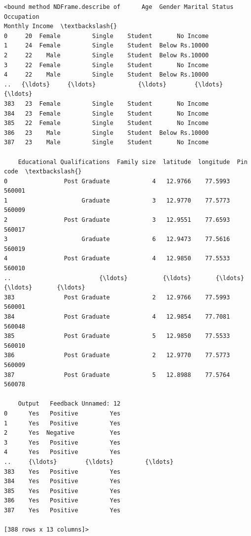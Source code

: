 \documentclass[11pt]{article}
\makeatletter
\newcommand{\boxspacing}{\kern\kvtcb@left@rule\kern\kvtcb@boxsep}
\newcommand{\prompt}[4]{
        {\ttfamily\llap{{\color{#2}[#3]:\hspace{3pt}#4}}\vspace{-\baselineskip}}
    }
\makeatother
\begin{document}
            \begin{tcolorbox}[breakable, size=fbox, boxrule=.5pt, pad at break*=1mm, opacityfill=0]
\prompt{Out}{outcolor}{7}{\boxspacing}
\begin{Verbatim}[commandchars=\\\{\}]
<bound method NDFrame.describe of      Age  Gender Marital Status Occupation
Monthly Income  \textbackslash{}
0     20  Female         Single    Student       No Income
1     24  Female         Single    Student  Below Rs.10000
2     22    Male         Single    Student  Below Rs.10000
3     22  Female         Single    Student       No Income
4     22    Male         Single    Student  Below Rs.10000
..   {\ldots}     {\ldots}            {\ldots}        {\ldots}             {\ldots}
383   23  Female         Single    Student       No Income
384   23  Female         Single    Student       No Income
385   22  Female         Single    Student       No Income
386   23    Male         Single    Student  Below Rs.10000
387   23    Male         Single    Student       No Income

    Educational Qualifications  Family size  latitude  longitude  Pin code  \textbackslash{}
0                Post Graduate            4   12.9766    77.5993    560001
1                     Graduate            3   12.9770    77.5773    560009
2                Post Graduate            3   12.9551    77.6593    560017
3                     Graduate            6   12.9473    77.5616    560019
4                Post Graduate            4   12.9850    77.5533    560010
..                         {\ldots}          {\ldots}       {\ldots}        {\ldots}       {\ldots}
383              Post Graduate            2   12.9766    77.5993    560001
384              Post Graduate            4   12.9854    77.7081    560048
385              Post Graduate            5   12.9850    77.5533    560010
386              Post Graduate            2   12.9770    77.5773    560009
387              Post Graduate            5   12.8988    77.5764    560078

    Output   Feedback Unnamed: 12
0      Yes   Positive         Yes
1      Yes   Positive         Yes
2      Yes  Negative          Yes
3      Yes   Positive         Yes
4      Yes   Positive         Yes
..     {\ldots}        {\ldots}         {\ldots}
383    Yes   Positive         Yes
384    Yes   Positive         Yes
385    Yes   Positive         Yes
386    Yes   Positive         Yes
387    Yes   Positive         Yes

[388 rows x 13 columns]>
\end{Verbatim}
\end{tcolorbox}
        
\end{document}

